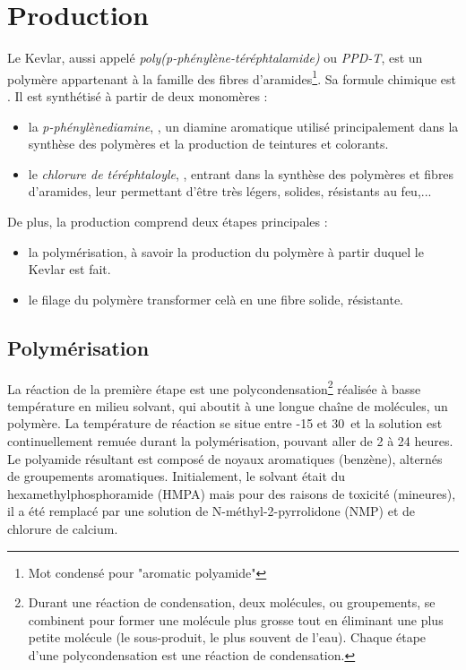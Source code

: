 \chapter{Production}

Le Kevlar, aussi appelé \textit{poly(p-phénylène-téréphtalamide)} ou \textit{PPD-T}, est un polymère appartenant à la famille des fibres d'aramides\footnote{Mot condensé pour "aromatic polyamide"}. Sa formule chimique est . Il est synthétisé à partir de deux monomères :

\begin{itemize}
	\item la \textit{p-phénylènediamine}, , un diamine aromatique utilisé principalement dans la synthèse des polymères et la production de teintures et colorants.
	\item le \textit{chlorure de téréphtaloyle}, , entrant dans la synthèse des polymères et fibres d'aramides, leur permettant d'être très légers, solides, résistants au feu,... 
\end{itemize}

\bigbreak

De plus, la production comprend deux étapes principales :

\begin{itemize}
	\item la polymérisation, à savoir la production du polymère à partir duquel le Kevlar est fait. 
	\item le filage du polymère transformer celà en une fibre solide, résistante.
\end{itemize}
	
	
\section{Polymérisation}

La réaction de la première étape est une polycondensation\footnote{Durant une réaction de condensation, deux molécules, ou groupements, se combinent pour former une molécule plus grosse tout en éliminant une plus petite molécule (le sous-produit, le plus souvent de l'eau). Chaque étape d'une polycondensation est une réaction de condensation.} réalisée à basse température en milieu solvant, qui aboutit à une longue chaîne de molécules, un polymère. La température de réaction se situe entre -15 et 30\celsius ~et la solution est continuellement remuée durant la polymérisation, pouvant aller de 2 à 24 heures. Le polyamide résultant est composé de noyaux aromatiques (benzène), alternés de groupements aromatiques. Initialement, le solvant était du hexamethylphosphoramide (HMPA) mais pour des raisons de toxicité (mineures), il a été remplacé par une solution de N-méthyl-2-pyrrolidone (NMP) et de chlorure de calcium.

